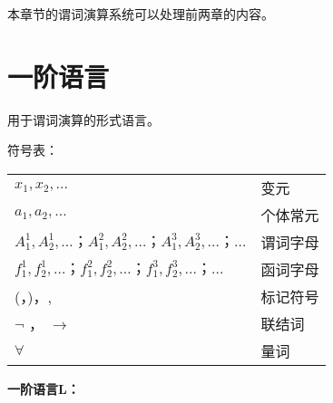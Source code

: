 \documentclass[12pt,onecolumn,a4paper]{book}
\numberwithin{table}{subsection}
\numberwithin{equation}{subsection}
\begin{document}
本章节的谓词演算系统可以处理前两章的内容。

\section{一阶语言}
用于谓词演算的形式语言。

符号表：

\begin{tabular}{ll}
    $x_1,x_2,…$ &变元\\
    $a_1,a_2,… $&个体常元\\
    $A_1^1 ,A_2^1 ,…； A_1^2 ,A_2^2 ,…； A_1^3 ,A_2^3 ,…； …$ &谓词字母\\
    $f_1^1 ,f_2^1 ,…； f_1^2 ,f_2^2 ,…； f_1^3 ,f_2^3 ,…； …$ &函词字母\\
    (，)，, &标记符号\\
    $\neg$ ， $\rightarrow $ &联结词\\
    $\forall $ &量词\\
\end{tabular}

\textbf{一阶语言L：} 
\end{document}
